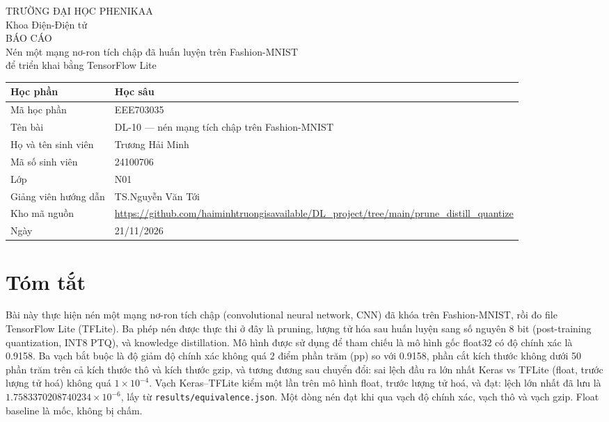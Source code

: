 \documentclass[13pt,a4paper]{article}
\begin{document}
\begin{center}
{\Large TRƯỜNG ĐẠI HỌC PHENIKAA}\\[0.4em]
Khoa Điện-Điện tử\\[1em]
\vspace{1cm}
{\LARGE BÁO CÁO}\\[0.5em]
{\large Nén một mạng nơ-ron tích chập đã huấn luyện trên Fashion-MNIST\\ để triển khai bằng TensorFlow Lite}\\[0.6em]
\end{center}
\vspace{1.2cm}
\begin{tabularx}{\textwidth}{|>{\raggedright\arraybackslash}p{4.6cm}|Y|}
\hline
Học phần & Học sâu \\ \hline
Mã học phần & EEE703035 \\ \hline
Tên bài & DL-10 --- nén mạng tích chập trên Fashion-MNIST \\ \hline
Họ và tên sinh viên & Trương Hải Minh \\ \hline
Mã số sinh viên & 24100706 \\ \hline
Lớp & N01 \\ \hline
Giảng viên hướng dẫn & TS.Nguyễn Văn Tới \\ \hline
Kho mã nguồn & \url{https://github.com/haiminhtruongisavailable/DL_project/tree/main/prune_distill_quantize} \\ \hline
Ngày & 21/11/2026 \\ \hline
\end{tabularx}
\newpage
\setcounter{tocdepth}{2}
\renewcommand{\contentsname}{Mục lục}
\tableofcontents

\section{Tóm tắt}
Bài này thực hiện nén một mạng nơ-ron tích chập (convolutional neural network, CNN) đã khóa trên Fashion-MNIST, rồi đo file TensorFlow Lite (TFLite).
Ba phép nén được thực thi ở đây là pruning, lượng tử hóa sau huấn luyện sang số nguyên 8 bit (post-training quantization, INT8 PTQ), và knowledge distillation.
Mô hình được sử dụng để tham chiếu là mô hình gốc float32 có độ chính xác là 0.9158.
Ba vạch bắt buộc là độ giảm độ chính xác không quá 2 điểm phần trăm (pp) so với 0.9158, phần cắt kích thước không dưới 50 phần trăm trên cả kích thước thô và kích thước gzip, và tương đương sau chuyển đổi: sai lệch đầu ra lớn nhất Keras vs TFLite (float, trước lượng tử hoá) không quá \(1\times 10^{-4}\).
Vạch Keras–TFLite kiểm một lần trên mô hình float, trước lượng tử hoá, và đạt: lệch lớn nhất đã lưu là \(1.7583370208740234\times 10^{-6}\), lấy từ \texttt{results/equivalence.json}.
Một dòng nén đạt khi qua vạch độ chính xác, vạch thô và vạch gzip.
Float baseline là mốc, không bị chấm.
\end{document}
